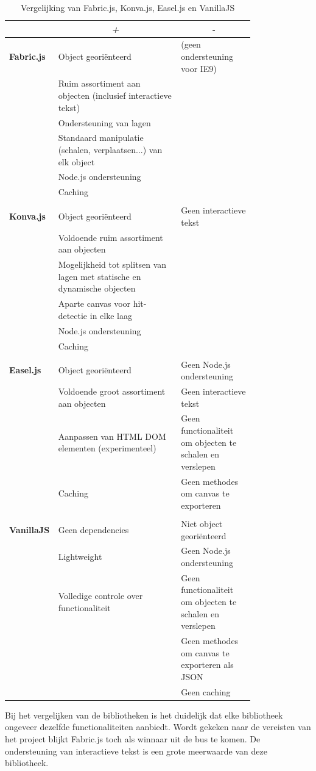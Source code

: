\begin{table}[H]
	\centering
	\begin{tabular}{|l|p{0.5\linewidth}|p{0.3\linewidth}|}
		\hline
		 &
		\multicolumn{1}{|c|}{\textit{\textbf{+}}} & \multicolumn{1}{c|}{\textit{\textbf{-}}}                                                   \tabularnewline \hline
		\textbf{Fabric.js} & Object geori\"{e}nteerd & (geen ondersteuning voor IE9)\tabularnewline
		&Ruim assortiment aan objecten (inclusief interactieve tekst)&\tabularnewline 
		&Ondersteuning van lagen&\tabularnewline 
		&Standaard manipulatie (schalen, verplaatsen...) van elk object&\tabularnewline 
		&Node.js ondersteuning&\tabularnewline 
		&Caching&\tabularnewline 
		&&\tabularnewline 
		\textbf{Konva.js}&Object geori\"{e}nteerd & Geen interactieve tekst\tabularnewline 
		&Voldoende ruim assortiment aan objecten&\tabularnewline 
		&Mogelijkheid tot splitsen van lagen met statische en dynamische objecten&\tabularnewline 
		&Aparte canvas voor hit-detectie in elke laag&\tabularnewline 
		&Node.js ondersteuning&\tabularnewline 
		&Caching&\tabularnewline 
		&&\tabularnewline 
		\textbf{Easel.js}&Object geori\"{e}nteerd&Geen Node.js ondersteuning\tabularnewline 
		&Voldoende groot assortiment aan objecten&Geen interactieve tekst\tabularnewline 
		&Aanpassen van HTML DOM elementen (experimenteel)&Geen functionaliteit om objecten te schalen en verslepen\tabularnewline 
		&Caching&Geen methodes om canvas te exporteren\tabularnewline 
		&&\tabularnewline 
		\textbf{VanillaJS}&Geen dependencies&Niet object geori\"{e}nteerd\tabularnewline 
		&Lightweight&Geen Node.js ondersteuning\tabularnewline 		
		&Volledige controle over functionaliteit&Geen functionaliteit om objecten te schalen en verslepen\tabularnewline 
		&&Geen methodes om canvas te exporteren als JSON\tabularnewline 
		&&Geen caching\tabularnewline 
 \hline
	\end{tabular}
	\caption{Vergelijking van Fabric.js, Konva.js, Easel.js en VanillaJS}
	\label{tabeltextureprofiling}   
\end{table}

Bij het vergelijken van de bibliotheken is het duidelijk dat elke bibliotheek ongeveer dezelfde functionaliteiten aanbiedt. Wordt gekeken naar de vereisten van het project blijkt Fabric.js toch als winnaar uit de bus te komen. De ondersteuning van interactieve tekst is een grote meerwaarde van deze bibliotheek. 
	
	


